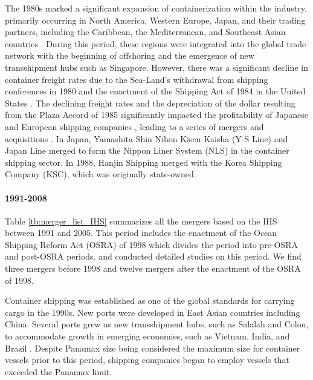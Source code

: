 \documentclass[10pt]{article}
\begin{document}
The 1980s marked a significant expansion of containerization within the industry, primarily occurring in North America, Western Europe, Japan, and their trading partners, including the Caribbean, the Mediterranean, and Southeast Asian countries \citep{GUERRERO2014151}. During this period, these regions were integrated into the global trade network with the beginning of offshoring and the emergence of new transshipment hubs such as Singapore. However, there was a significant decline in container freight rates due to the Sea-Land's withdrawal from shipping conferences in 1980 and the enactment of the Shipping Act of 1984 in the United States \citep{matsuda2022unified}. 
The declining freight rates and the depreciation of the dollar resulting from the Plaza Accord of 1985 significantly impacted the profitability of Japanese and European shipping companies \citep{Matsuda2018}, leading to a series of mergers and acquisitions .
In Japan, Yamashita Shin Nihon Kisen Kaisha (Y-S Line) and Japan Line merged to form the Nippon Liner System (NLS) in the container shipping sector. In 1988, Hanjin Shipping merged with the Korea Shipping Company (KSC), which was originally state-owned. %

\paragraph{1991-2008}

Table \ref{tb:merger_list_IHS} summarizes all the mergers based on the IHS between 1991 and 2005.
This period includes the enactment of the Ocean Shipping Reform Act (OSRA) of 1998 which divides the period into pre-OSRA and post-OSRA periods. 
\cite{fusillo2006some,fusillo2013stability} and \cite{reitzes2002rolling} conducted detailed studies on this period.
We find three mergers before 1998 and twelve mergers after the enactment of the OSRA of 1998.

Container shipping was established as one of the global standards for carrying cargo in the 1990s. 
New ports were developed in East Asian countries including China. Several ports grew as new transshipment hubs, such as Salalah and Colon, to accommodate growth in emerging economies, such as Vietnam, India, and Brazil \citep{GUERRERO2014151}. Despite Panamax size being considered the maximum size for container vessels prior to this period, shipping companies began to employ vessels that exceeded the Panamax limit.
\end{document}
